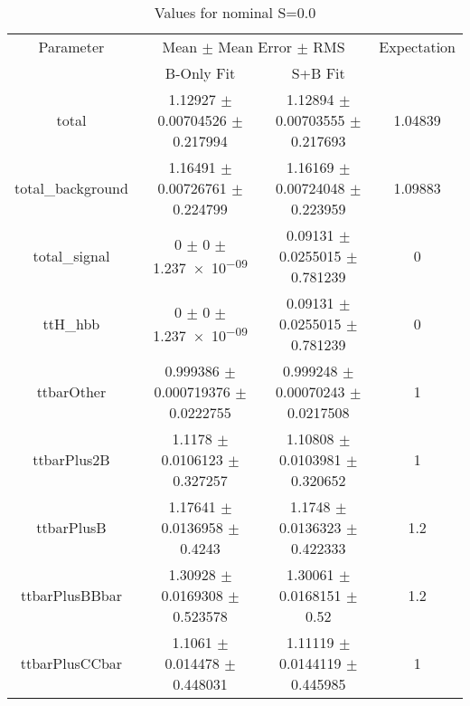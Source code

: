 \begin{table}
\centering
\caption{Values for nominal S=0.0}
\begin{tabular}{cccc}
\toprule
Parameter & \multicolumn{2}{c}{Mean $\pm$ Mean Error $\pm$ RMS} & Expectation\\
 & B-Only Fit & S+B Fit & \\
\midrule
total & \num{1.12927} $\pm$ \num{0.00704526} $\pm$ \num{0.217994} & \num{1.12894} $\pm$ \num{0.00703555} $\pm$ \num{0.217693} & \num{1.04839}\\
total\_background & \num{1.16491} $\pm$ \num{0.00726761} $\pm$ \num{0.224799} & \num{1.16169} $\pm$ \num{0.00724048} $\pm$ \num{0.223959} & \num{1.09883}\\
total\_signal & \num{0} $\pm$ \num{0} $\pm$ \num{1.237e-09} & \num{0.09131} $\pm$ \num{0.0255015} $\pm$ \num{0.781239} & \num{0}\\
ttH\_hbb & \num{0} $\pm$ \num{0} $\pm$ \num{1.237e-09} & \num{0.09131} $\pm$ \num{0.0255015} $\pm$ \num{0.781239} & \num{0}\\
ttbarOther & \num{0.999386} $\pm$ \num{0.000719376} $\pm$ \num{0.0222755} & \num{0.999248} $\pm$ \num{0.00070243} $\pm$ \num{0.0217508} & \num{1}\\
ttbarPlus2B & \num{1.1178} $\pm$ \num{0.0106123} $\pm$ \num{0.327257} & \num{1.10808} $\pm$ \num{0.0103981} $\pm$ \num{0.320652} & \num{1}\\
ttbarPlusB & \num{1.17641} $\pm$ \num{0.0136958} $\pm$ \num{0.4243} & \num{1.1748} $\pm$ \num{0.0136323} $\pm$ \num{0.422333} & \num{1.2}\\
ttbarPlusBBbar & \num{1.30928} $\pm$ \num{0.0169308} $\pm$ \num{0.523578} & \num{1.30061} $\pm$ \num{0.0168151} $\pm$ \num{0.52} & \num{1.2}\\
ttbarPlusCCbar & \num{1.1061} $\pm$ \num{0.014478} $\pm$ \num{0.448031} & \num{1.11119} $\pm$ \num{0.0144119} $\pm$ \num{0.445985} & \num{1}\\
\bottomrule
\end{tabular}
\end{table}